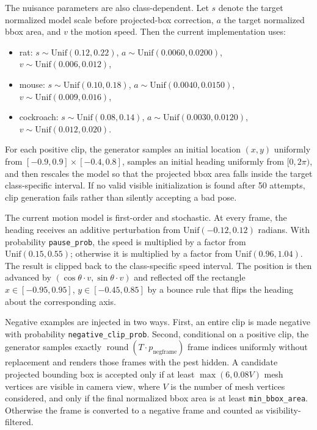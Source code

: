 \documentclass[11pt]{article}
\begin{document}
The nuisance parameters are also class-dependent. Let $s$ denote the target normalized model scale before projected-box correction, $a$ the target normalized bbox area, and $v$ the motion speed. Then the current implementation uses:
\begin{itemize}[leftmargin=1.5em]
    \item rat: $s \sim \mathrm{Unif}(0.12, 0.22)$, $a \sim \mathrm{Unif}(0.0060, 0.0200)$, $v \sim \mathrm{Unif}(0.006, 0.012)$,
    \item mouse: $s \sim \mathrm{Unif}(0.10, 0.18)$, $a \sim \mathrm{Unif}(0.0040, 0.0150)$, $v \sim \mathrm{Unif}(0.009, 0.016)$,
    \item cockroach: $s \sim \mathrm{Unif}(0.08, 0.14)$, $a \sim \mathrm{Unif}(0.0030, 0.0120)$, $v \sim \mathrm{Unif}(0.012, 0.020)$.
\end{itemize}
For each positive clip, the generator samples an initial location $(x,y)$ uniformly from $[-0.9,0.9] \times [-0.4,0.8]$, samples an initial heading uniformly from $[0,2\pi)$, and then rescales the model so that the projected bbox area falls inside the target class-specific interval. If no valid visible initialization is found after 50 attempts, clip generation fails rather than silently accepting a bad pose.

The current motion model is first-order and stochastic. At every frame, the heading receives an additive perturbation from $\mathrm{Unif}(-0.12,0.12)$ radians. With probability \texttt{pause\_prob}, the speed is multiplied by a factor from $\mathrm{Unif}(0.15,0.55)$; otherwise it is multiplied by a factor from $\mathrm{Unif}(0.96,1.04)$. The result is clipped back to the class-specific speed interval. The position is then advanced by $(\cos \theta \cdot v, \sin \theta \cdot v)$ and reflected off the rectangle $x \in [-0.95,0.95]$, $y \in [-0.45,0.85]$ by a bounce rule that flips the heading about the corresponding axis.

Negative examples are injected in two ways. First, an entire clip is made negative with probability \texttt{negative\_clip\_prob}. Second, conditional on a positive clip, the generator samples exactly $\operatorname{round}(T \cdot p_{\mathrm{negframe}})$ frame indices uniformly without replacement and renders those frames with the pest hidden. A candidate projected bounding box is accepted only if at least $\max(6, 0.08V)$ mesh vertices are visible in camera view, where $V$ is the number of mesh vertices considered, and only if the final normalized bbox area is at least \texttt{min\_bbox\_area}. Otherwise the frame is converted to a negative frame and counted as visibility-filtered.
\end{document}
